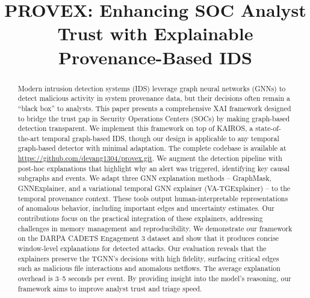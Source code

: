 \documentclass[conference]{IEEEtran}
\begin{document}
\title{PROVEX: Enhancing SOC Analyst Trust with Explainable Provenance-Based IDS}

\author{
\and
{}
}

\maketitle

\begin{abstract}
Modern intrusion detection systems (IDS) leverage graph neural networks (GNNs) to detect malicious activity in system provenance data, but their decisions often remain a ``black box'' to analysts. This paper presents a comprehensive XAI framework designed to bridge the trust gap in Security Operations Centers (SOCs) by making graph-based detection transparent. We implement this framework on top of KAIROS, a state-of-the-art temporal graph-based IDS, though our design is applicable to any temporal graph-based detector with minimal adaptation. The complete codebase is available at \url{https://github.com/devang1304/provex.git}. We augment the detection pipeline with post-hoc explanations that highlight why an alert was triggered, identifying key causal subgraphs and events. We adapt three GNN explanation methods -- GraphMask, GNNExplainer, and a variational temporal GNN explainer (VA-TGExplainer) -- to the temporal provenance context. These tools output human-interpretable representations of anomalous behavior, including important edges and uncertainty estimates. Our contributions focus on the practical integration of these explainers, addressing challenges in memory management and reproducibility. We demonstrate our framework on the DARPA CADETS Engagement 3 dataset and show that it produces concise window-level explanations for detected attacks. Our evaluation reveals that the explainers preserve the TGNN's decisions with high fidelity, surfacing critical edges such as malicious file interactions and anomalous netflows. The average explanation overhead is 3--5 seconds per event. By providing insight into the model's reasoning, our framework aims to improve analyst trust and triage speed.
\end{abstract}
\end{document}
